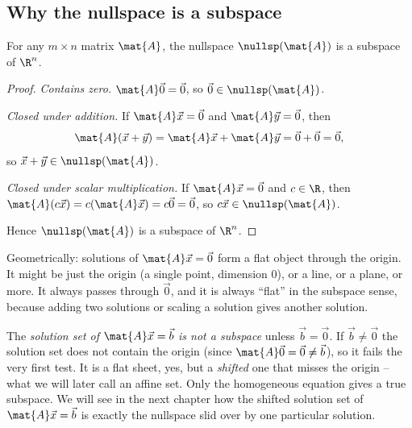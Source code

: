 \subsection{Why the nullspace is a subspace}

\begin{proposition}\label{ch12:nullspace-subspace}
For any $m\times n$ matrix $\mat{A}$, the nullspace $\nullsp(\mat{A})$ is a
subspace of $\R^n$.
\end{proposition}

\begin{proof}
\emph{Contains zero.} $\mat{A}\vec{0}=\vec{0}$, so $\vec{0}\in\nullsp(\mat{A})$.

\emph{Closed under addition.} If $\mat{A}\vec{x}=\vec{0}$ and
$\mat{A}\vec{y}=\vec{0}$, then
\[
  \mat{A}(\vec{x}+\vec{y}) = \mat{A}\vec{x}+\mat{A}\vec{y} = \vec{0}+\vec{0}
  = \vec{0},
\]
so $\vec{x}+\vec{y}\in\nullsp(\mat{A})$.

\emph{Closed under scalar multiplication.} If $\mat{A}\vec{x}=\vec{0}$ and
$c\in\R$, then $\mat{A}(c\vec{x}) = c(\mat{A}\vec{x}) = c\vec{0} = \vec{0}$, so
$c\vec{x}\in\nullsp(\mat{A})$.

Hence $\nullsp(\mat{A})$ is a subspace of $\R^n$. \qedhere
\end{proof}

Geometrically: solutions of $\mat{A}\vec{x}=\vec{0}$ form a flat object through
the origin. It might be just the origin (a single point, dimension $0$), or a
line, or a plane, or more. It always passes through $\vec{0}$, and it is always
``flat'' in the subspace sense, because adding two solutions or scaling a solution
gives another solution.

\begin{trapbox}
The \emph{solution set of $\mat{A}\vec{x}=\vec{b}$ is not a subspace} unless
$\vec{b}=\vec{0}$. If $\vec{b}\neq\vec{0}$ the solution set does not contain the
origin (since $\mat{A}\vec{0}=\vec{0}\neq\vec{b}$), so it fails the very first
test. It is a flat sheet, yes, but a \emph{shifted} one that misses the origin --
what we will later call an affine set. Only the homogeneous equation gives a true
subspace. We will see in the next chapter how the shifted solution set of
$\mat{A}\vec{x}=\vec{b}$ is exactly the nullspace slid over by one particular
solution.
\end{trapbox}

